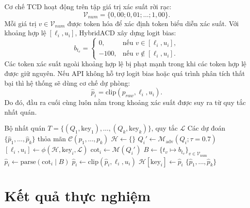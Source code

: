 \documentclass[pdflatex,sn-mathphys-num,oneside]{sn-jnl}
\begin{document}
Cơ chế TCD hoạt động trên tập giá trị xác suất rời rạc:
\[
  \mathcal{V}_{num}=\{0,00;0,01;\ldots;1,00\}.
\]
Mỗi giá trị $v\in\mathcal{V}_{num}$ được token hóa để xác định token biểu diễn xác suất. Với khoảng hợp lệ $[\ell_i,u_i]$, HybridACD xây dựng logit bias:
\begin{equation}
  b_{t_v} =
  \begin{cases}
    0, & \text{nếu } v \in [\ell_i,u_i],\\
    -100, & \text{nếu } v \notin [\ell_i,u_i].
  \end{cases}
\end{equation}
Các token xác suất ngoài khoảng hợp lệ bị phạt mạnh trong khi các token hợp lệ được giữ nguyên. Nếu API không hỗ trợ logit bias hoặc quá trình phân tích thất bại thì hệ thống sẽ dùng cơ chế dự phòng:
\begin{equation}
  \hat{p}_i=\text{clip}(p_{raw},\ell_i,u_i).
\end{equation}
Do đó, đầu ra cuối cùng luôn nằm trong khoảng xác suất được suy ra từ quy tắc nhất quán.

\begin{algorithm}
\caption{Pipeline Suy luận HybridACD}
\label{alg:hybridacd}
\begin{algorithmic}[1]
\Require Bộ nhất quán $T = \{(Q_1, \text{key}_1), \ldots, (Q_k, \text{key}_k)\}$, quy tắc $\mathcal{L}$
\Ensure Các dự đoán $\{\hat{p}_1, \ldots, \hat{p}_k\}$ thỏa mãn $\mathcal{C}(p_1, \ldots, p_k)$
\State $\mathcal{H} \gets \{\}$ 
  \State $Q_i' \gets \mathcal{M}_\text{adv}(Q_i; \tau=0.7)$ 
  \State $[\ell_i, u_i] \gets \phi(\mathcal{H}, \text{key}_i, \mathcal{L})$ 
  \State $\text{cot}_i \gets \mathcal{M}(Q_i')$ 
  \State $B \gets \{t_v \mapsto b_{t_v}\}_{v \in \mathcal{V}_\text{num}}$ 
  \State $\hat{p}_i \gets \text{parse}(\text{cot}_i \mid B)$ 
  \State $\hat{p}_i \gets \text{clip}(\hat{p}_i, \ell_i, u_i)$ 
  \State $\mathcal{H}[\text{key}_i] \gets \hat{p}_i$ 
\EndFor
\State \Return $\{\hat{p}_1, \ldots, \hat{p}_k\}$
\end{algorithmic}
\end{algorithm}

\section{Kết quả thực nghiệm}\label{sec:results}
\end{document}
